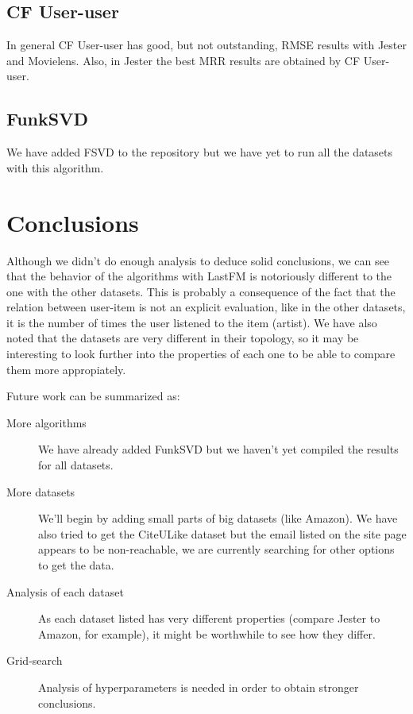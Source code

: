 \documentclass[a4paper]{article}
\begin{document}
\subsection{CF User-user}
In general CF User-user has good, but not outstanding, RMSE results with Jester and Movielens. Also, in Jester the best MRR results are obtained by CF User-user.

\subsection{FunkSVD}
We have added FSVD to the repository but we have yet to run all the datasets with this algorithm.



\section{Conclusions}
Although we didn't do enough analysis to deduce solid conclusions, we can see that the behavior of the algorithms with LastFM is notoriously different to the one with the other datasets. This is probably a consequence of the fact that the relation between user-item is not an explicit evaluation, like in the other datasets, it is the number of times the user listened to the item (artist). We have also noted that the datasets are very different in their topology, so it may be interesting to look further into the properties of each one to be able to compare them more appropiately.

Future work can be summarized as:
\begin{description}
\item[More algorithms] We have already added FunkSVD but we haven't yet compiled the results for all datasets.
\item[More datasets] We'll begin by adding small parts of big datasets (like Amazon). We have also tried to get the CiteULike dataset but the email listed on the site page appears to be non-reachable, we are currently searching for other options to get the data.
\item[Analysis of each dataset] As each dataset listed has very different properties (compare Jester to Amazon, for example), it might be worthwhile to see how they differ.
\item[Grid-search] Analysis of hyperparameters is needed in order to obtain stronger conclusions.
\end{description}
\end{document}
